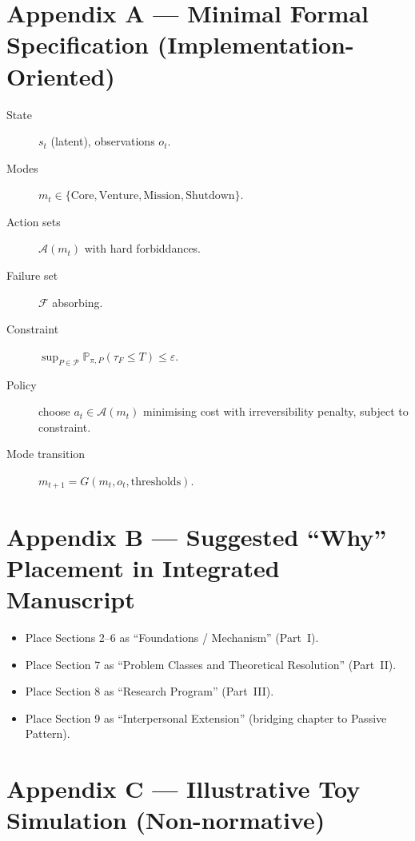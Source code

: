 \section*{Appendix A --- Minimal Formal Specification
(Implementation-Oriented)}
\label{sec:foundations-app-A}

\begin{description}
\item[State] $s_t$ (latent), observations $o_t$.
\item[Modes] $m_t \in \{\text{Core}, \text{Venture}, \text{Mission},
\text{Shutdown}\}$.
\item[Action sets] $\mathcal{A}(m_t)$ with hard forbiddances.
\item[Failure set] $\mathcal{F}$ absorbing.
\item[Constraint]
$\sup_{P \in \mathcal{P}} \mathbb{P}_{\pi, P}(\tau_F \le T) \le
\varepsilon$.
\item[Policy] choose $a_t \in \mathcal{A}(m_t)$ minimising cost with
irreversibility penalty, subject to constraint.
\item[Mode transition]
$m_{t+1} = G(m_t, o_t, \text{thresholds})$.
\end{description}

\section*{Appendix B --- Suggested ``Why'' Placement in Integrated
Manuscript}
\label{sec:foundations-app-B}

\begin{itemize}
\item Place Sections 2--6 as ``Foundations / Mechanism'' (Part~I).
\item Place Section 7 as ``Problem Classes and Theoretical
Resolution'' (Part~II).
\item Place Section 8 as ``Research Program'' (Part~III).
\item Place Section 9 as ``Interpersonal Extension'' (bridging
chapter to Passive Pattern).
\end{itemize}

\section*{Appendix C --- Illustrative Toy Simulation (Non-normative)}
\label{sec:foundations-app-C}


